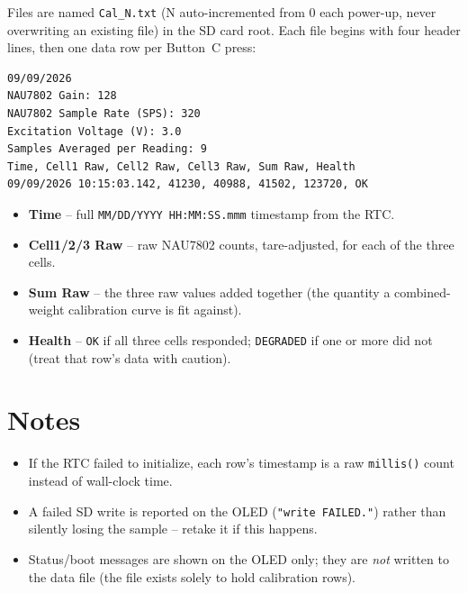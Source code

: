 \documentclass[11pt,letterpaper]{article}
\begin{document}
Files are named \texttt{Cal\_N.txt} (N auto-incremented from 0 each power-up,
never overwriting an existing file) in the SD card root. Each file begins
with four header lines, then one data row per Button~C press:

\begin{minipage}{\textwidth}
\begin{lstlisting}[language={},numbers=none]
09/09/2026
NAU7802 Gain: 128
NAU7802 Sample Rate (SPS): 320
Excitation Voltage (V): 3.0
Samples Averaged per Reading: 9
Time, Cell1 Raw, Cell2 Raw, Cell3 Raw, Sum Raw, Health
09/09/2026 10:15:03.142, 41230, 40988, 41502, 123720, OK
\end{lstlisting}
\end{minipage}

\begin{itemize}[nosep]
  \item \textbf{Time} -- full \texttt{MM/DD/YYYY HH:MM:SS.mmm} timestamp
        from the RTC.
  \item \textbf{Cell1/2/3 Raw} -- raw NAU7802 counts, tare-adjusted, for
        each of the three cells.
  \item \textbf{Sum Raw} -- the three raw values added together (the
        quantity a combined-weight calibration curve is fit against).
  \item \textbf{Health} -- \texttt{OK} if all three cells responded;
        \texttt{DEGRADED} if one or more did not (treat that row's data
        with caution).
\end{itemize}

\section{Notes}

\begin{itemize}[nosep]
  \item If the RTC failed to initialize, each row's timestamp is a raw
        \texttt{millis()} count instead of wall-clock time.
  \item A failed SD write is reported on the OLED (\texttt{"write
        FAILED."}) rather than silently losing the sample -- retake it if
        this happens.
  \item Status/boot messages are shown on the OLED only; they are
        \emph{not} written to the data file (the file exists solely to
        hold calibration rows).
\end{itemize}
\end{document}
